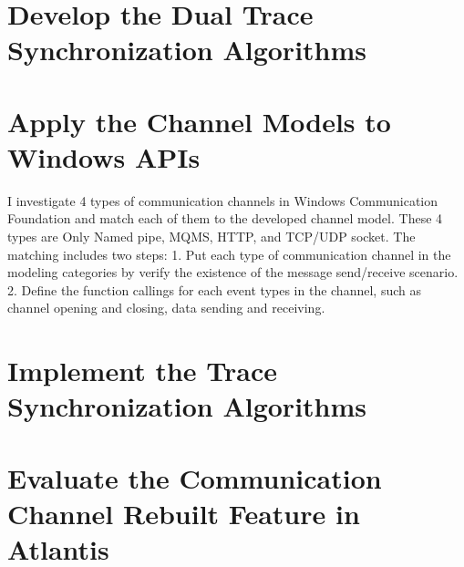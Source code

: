 \section{Develop the Dual Trace Synchronization Algorithms}


\section{Apply the Channel Models to Windows APIs}
I investigate 4 types of communication channels in Windows Communication Foundation and match each of them to the developed channel model. These 4 types are Only Named pipe, MQMS, HTTP, and TCP/UDP socket. The matching includes two steps: 1. Put each type of communication channel in the modeling categories by verify the existence of the message send/receive scenario. 2. Define the function callings for each event types in the channel, such as channel opening and closing, data sending and receiving. 

\section{Implement the Trace Synchronization Algorithms}

\section{Evaluate the Communication Channel Rebuilt Feature in Atlantis}